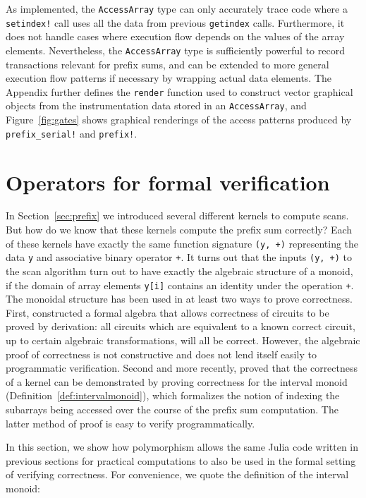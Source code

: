 \documentclass{sig-alternate}
\newcommand{\code}[1]{\texttt{#1}}
\begin{document}
As implemented, the \code{AccessArray} type can only accurately trace code
where a \code{setindex!} call uses all the data from previous \code{getindex}
calls. Furthermore, it does not handle cases where execution flow depends on
the values of the array elements. Nevertheless, the \code{AccessArray} type is
sufficiently powerful to record transactions relevant for prefix sums, and can
be extended to more general execution flow patterns if necessary by wrapping
actual data elements. The Appendix further defines the \code{render} function
used to construct vector graphical objects from the instrumentation data stored
in an \code{AccessArray}, and Figure~\ref{fig:gates} shows graphical renderings
of the access patterns produced by \code{prefix\_serial!} and \code{prefix!}.

\section{Operators for formal verification}

In Section~\ref{sec:prefix} we introduced several different kernels to compute
scans. But how do we know that these kernels compute the prefix sum correctly?
Each of these kernels have exactly the same function signature \code{(y,
+)} representing the data \code{y} and associative binary operator \code{+}.
It turns out that the inputs \code{(y, +)} to the scan algorithm turn out to
have exactly the algebraic structure of a monoid, if the domain of array
elements \code{y[i]} contains an identity under the operation \code{+}. The
monoidal structure has been used in at least two ways to prove correctness.
First, \cite{Hinze2004} constructed a formal algebra that allows correctness of
circuits to be proved by derivation: all circuits which are equivalent to a
known correct circuit, up to certain algebraic transformations, will all be
correct. However, the algebraic proof of correctness is not constructive and
does not lend itself easily to programmatic verification. Second and more
recently, \cite{Chong2014} proved that the correctness of a kernel can be
demonstrated by proving correctness for the interval monoid
(Definition~\ref{def:intervalmonoid}), which formalizes the notion of indexing
the subarrays being accessed over the course of the prefix sum computation. The
latter method of proof is easy to verify programmatically.

In this section, we show how polymorphism allows the same Julia code written in
previous sections for practical computations to also be used in the formal
setting of verifying correctness. For convenience, we quote the definition of
the interval monoid:
\end{document}
